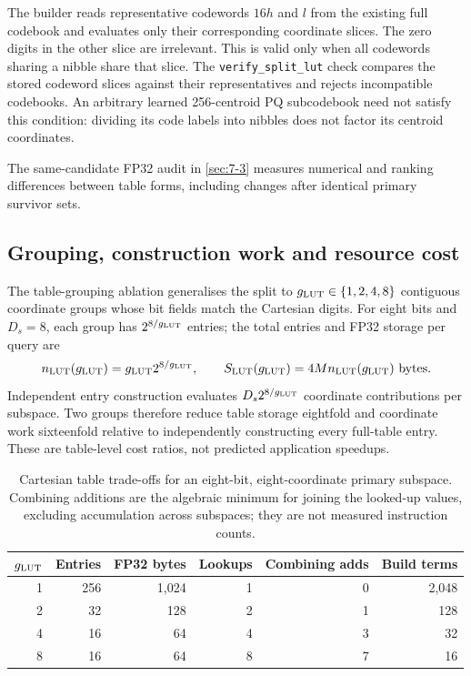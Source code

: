 The builder reads representative codewords $16h$ and $l$ from the
existing full codebook and evaluates only their corresponding coordinate
slices. The zero digits in the other slice are irrelevant. This is valid
only when all codewords sharing a nibble share that slice. The
\texttt{verify\_split\_lut} check compares the stored codeword slices
against their representatives and rejects incompatible codebooks.
An arbitrary learned 256-centroid PQ subcodebook need not satisfy this
condition: dividing its code labels into nibbles does not factor its
centroid coordinates.

The same-candidate FP32 audit in \cref{sec:7-3} measures numerical
and ranking differences between table forms, including changes after
identical primary survivor sets.


\subsection{Grouping, construction work and resource cost}

The table-grouping ablation generalises the split to $g_{\mathrm{LUT}}\in\{1,2,4,8\}$
contiguous coordinate groups whose bit fields match the Cartesian
digits. For eight bits and $D_s=8$, each group has $2^{8/g_{\mathrm{LUT}}}$ entries;
the total entries and FP32 storage per query are
\begin{equation}
 n_{\rm LUT}(g_{\mathrm{LUT}})=g_{\mathrm{LUT}} 2^{8/g_{\mathrm{LUT}}},\qquad S_{\rm LUT}(g_{\mathrm{LUT}})=4Mn_{\rm LUT}(g_{\mathrm{LUT}})\ \text{bytes}.
 \label{eq:5-lut-cost}
\end{equation}
Independent entry construction evaluates $D_s2^{8/g_{\mathrm{LUT}}}$ coordinate
contributions per subspace. Two groups therefore reduce table storage
eightfold and coordinate work sixteenfold relative to independently
constructing every full-table entry. These are table-level cost ratios,
not predicted application speedups.

\begin{table}[tbp]
\centering
\caption[Cartesian lookup-table trade-offs]{Cartesian table trade-offs for an eight-bit, eight-coordinate
primary subspace. Combining additions are the algebraic minimum for
joining the looked-up values, excluding accumulation across subspaces;
they are not measured instruction counts.}
\label{tab:5-lut-resources}
\small
\begin{tabular}{@{}rrrrrr@{}}
\toprule
$g_{\mathrm{LUT}}$ & Entries & FP32 bytes & Lookups & Combining adds & Build terms \\
\midrule
1 & 256 & 1,024 & 1 & 0 & 2,048 \\
2 & 32 & 128 & 2 & 1 & 128 \\
4 & 16 & 64 & 4 & 3 & 32 \\
8 & 16 & 64 & 8 & 7 & 16 \\
\bottomrule
\end{tabular}
\end{table}

